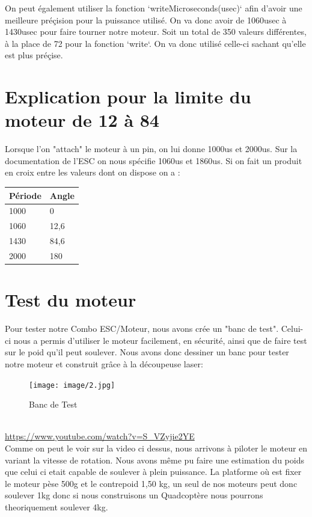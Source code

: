 \documentclass[10pt,a4paper]{article}
\begin{document}
 On peut également utiliser la fonction `writeMicroseconds(usec)` afin d'avoir une meilleure préçision pour la puissance utilisé. On va donc avoir de 1060usec à 1430usec pour faire tourner notre moteur. Soit un total de 350 valeurs différentes, à la place de 72 pour la fonction `write`. On va donc utilisé celle-ci sachant qu'elle est plus préçise.

\section{Explication pour la limite du moteur de 12 à 84}
Lorsque l'on "attach" le moteur à un pin, on lui donne 1000us et 2000us. Sur la documentation de l'ESC on nous spécifie 1060us et 1860us. Si on fait un produit en croix entre les valeurs dont on dispose on a :\\

\begin{tabular}{|l|l|}
    Période  & Angle  \tabularnewline    \hline
    1000  & 0  \tabularnewline    \hline
    1060  & 12,6 \tabularnewline    \hline
    1430  & 84,6  \tabularnewline    \hline
    2000  & 180  \tabularnewline    \hline
    
   
        
 \end{tabular}
 \section{Test du moteur}
 Pour tester notre Combo ESC/Moteur, nous avons crée un "banc de test". Celui-ci nous a permis d'utiliser le moteur facilement, en sécurité, ainsi que de faire test sur le poid qu'il peut soulever. Nous avons donc dessiner un banc pour tester notre moteur et construit grâce à la découpeuse laser: \\
 \begin{figure}[h!]
\centering
\texttt{[image: image/2.jpg]}
\caption{Banc de Test}
\label{fig:net }
\end{figure}\\
\url{https://www.youtube.com/watch?v=S_VZyjie2YE}\\
Comme on peut le voir sur la video ci dessus,  nous arrivons à piloter le moteur en variant la vitesse de rotation. Nous avons même pu faire une estimation du poids que celui ci etait capable de soulever à plein puissance. La platforme où est fixer le moteur pèse 500g et le contrepoid 1,50 kg, un seul de nos moteurs peut donc soulever 1kg donc si nous construisons un Quadcoptère nous pourrons theoriquement soulever 4kg.
\end{document}
